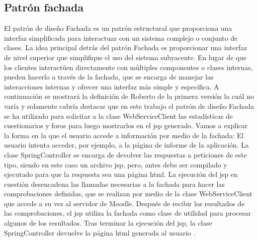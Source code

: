 \subsection{Patrón fachada}
El patrón de diseño Fachada es un patrón estructural que proporciona una interfaz simplificada para interactuar con un sistema complejo o conjunto de clases. La idea principal detrás del patrón Fachada es proporcionar una interfaz de nivel superior que simplifique el uso del sistema subyacente. En lugar de que los clientes interactúen directamente con múltiples componentes o clases internas, pueden hacerlo a través de la fachada, que se encarga de manejar las interacciones internas y ofrecer una interfaz más simple y específica.
A continuación se mostrará la definición de Roberto de la primera versión la cuál no varía y solamente cabría destacar que en este trabajo el patrón de diseño Fachada se ha utilizado para solicitar a la clase WebServiceClient las estadísticas de cuestionarios y foros para luego mostrarlos en el jsp generado.
Vamos a explicar la forma en la que el usuario accede a información por medio de la fachada:
El usuario intenta acceder, por ejemplo, a la página de informe de la aplicación. La clase SpringController se encarga de devolver las respuestas a peticiones de este tipo, siendo en este caso un archivo jsp, pero, antes debe ser compilado y ejecutado para que la respuesta sea una página html. La ejecución del jsp en cuestión desencadena las llamadas necesarias a la fachada para hacer las comprobaciones definidas, que se realizan por medio de la clase WebServiceClient que accede a su vez al servidor de Moodle. Después de recibir los resultados de las comprobaciones, el jsp utiliza la fachada como clase de utilidad para procesar algunos de los resultados. Tras terminar la ejecución del jsp, la clase SpringController devuelve la página html generada al usuario \cite{previotfganexos}.